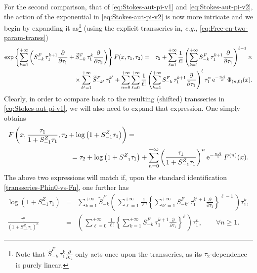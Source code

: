 \documentclass[11pt,a4paper]{article}
\newcommand{\bea}{\begin{eqnarray}}
\newcommand{\eea}{\end{eqnarray}}
\newcommand{\rme}{{\mathrm{e}}}
\begin{document}
For the second comparison, that of \eqref{eq:Stokes-aut-pi-v1} and \eqref{eq:Stokes-aut-pi-v2}, the action of the exponential in \eqref{eq:Stokes-aut-pi-v2} is now more intricate and we begin by expanding it as\footnote{Note that $\widetilde{S}_{-k}^F\, \tau_1^k \frac{\partial}{\partial\tau_2}$ only acts once upon the transseries, as its $\tau_2$-dependence is purely linear.} (using the explicit transseries in, \textit{e.g.}, \eqref{eq:Free-en-two-param-transs})
%
\bea
\exp \left\{ \sum_{k=1}^{+\infty} \left( S_{-k}^{F}\, \tau_1^{k+1} \frac{\partial}{\partial\tau_1} + \widetilde{S}_{-k}^F\, \tau_1^k \frac{\partial}{\partial\tau_2} \right) \right\} F (x, \tau_{1}, \tau_{2}) &=& \tau_2 + \sum_{\ell=1}^{+\infty} \frac{1}{\ell!} \left( \sum_{k=1}^{+\infty} S_{-k}^{F}\, \tau_1^{k+1} \frac{\partial}{\partial\tau_1} \right)^{\ell-1} \times \nonumber \\
&&
\hspace{-200pt}
\times \sum_{k'=1}^{+\infty}\widetilde{S}_{-k'}^F\, \tau_1^{k'} + \sum_{n=0}^{+\infty} \sum_{\ell=0}^{+\infty} \frac{1}{\ell!} \left( \sum_{k=1}^{+\infty} S_{-k}^{F}\, \tau_1^{k+1} \frac{\partial}{\partial\tau_1}\right)^{\ell} \tau_1^n\, \rme^{-\frac{n A}{x}}\, \Phi_{(n,0)} (x).
\eea
% 
\noindent
Clearly, in order to compare back to the resulting (shifted) transseries in \eqref{eq:Stokes-aut-pi-v1}, we will also need to expand that expression. One simply obtains
%
\bea
\label{Stokes-freeen-pi-from-partfunc}
F \left(x, \frac{\tau_1}{1 + S_{-1}^{Z} \tau_{1}}, \tau_{2} + \log \left( 1 + S_{-1}^{Z} \tau_{1} \right) \right) &=& \\
&&
\hspace{-100pt}
= \tau_2 + \log \left( 1 + S_{-1}^{Z} \tau_{1} \right) + \sum_{n=0}^{+\infty} \left( \frac{\tau_1}{1 + S_{-1}^{Z} \tau_{1}} \right)^n \rme^{-\frac{n A}{x}}\, F^{(n)} (x). \nonumber
\eea
%
\noindent
The above two expressions will match if, upon the standard identification \eqref{transseries-Phin0-vs-Fn}, one further has
%
\begin{eqnarray}
\label{Stokes-comp-1st}
\log \left( 1 + S_{-1}^{Z} \tau_{1} \right) &=& \sum_{k=1}^{+\infty} \widetilde{S}_{-k}^F \left(\, \sum_{\ell=1}^{+\infty} \frac{1}{\ell!} \left\{ \sum_{k'=1}^{+\infty} S_{-k'}^{F}\, \tau_1^{k'+1} \frac{\partial}{\partial\tau_1} \right\}^{\ell-1}\, \right) \tau_1^{k}, \\
\frac{\tau_1^n}{\left( 1 + S_{-1}^{Z} \tau_{1} \right)^n} &=& \left(\, \sum_{\ell=0}^{+\infty} \frac{1}{\ell!} \left\{ \sum_{k=1}^{+\infty} S_{-k}^{F}\, \tau_1^{k+1} \frac{\partial}{\partial\tau_1} \right\}^{\ell}\, \right) \tau_1^n, \qquad \forall n\ge1.
\label{Stokes-comp-2nd}
\end{eqnarray}
\end{document}
